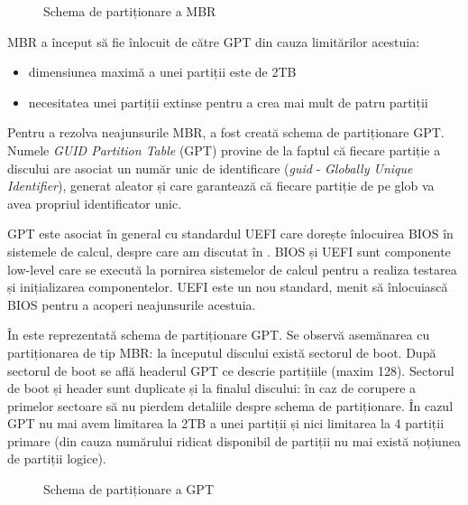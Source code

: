\begin{figure}[htbp]
  \centering
  \def\svgwidth{\columnwidth}
  
  \caption{Schema de partiționare a MBR}
  \label{fig:storage:mbr}
\end{figure}

MBR a început să fie înlocuit de către GPT din cauza limitărilor acestuia:
\begin{itemize}
  \item dimensiunea maximă a unei partiții este de 2TB
  \item necesitatea unei partiții extinse pentru a crea mai mult de patru partiții
\end{itemize}

Pentru a rezolva neajunsurile MBR, a fost creată schema de partiționare
GPT. Numele \textit{GUID Partition Table} (GPT) provine de la faptul că fiecare partiție a
discului are asociat un număr unic de identificare (\textit{guid} - \textit{Globally Unique Identifier}), generat aleator și
care garantează că fiecare partiție de pe glob va avea propriul identificator
unic.

GPT este asociat în general cu standardul UEFI care dorește înlocuirea
BIOS în sistemele de calcul, despre care am discutat în . BIOS și UEFI sunt componente low-level care
se execută la pornirea sistemelor de calcul pentru a realiza testarea și
inițializarea componentelor. UEFI este un nou standard, menit să înlocuiască
BIOS pentru a acoperi neajunsurile acestuia.

În  este reprezentată schema de
partiționare GPT. Se observă asemănarea cu partiționarea de tip MBR: la
începutul discului există sectorul de boot. După sectorul de boot se află headerul GPT ce descrie
partițiile (maxim 128). Sectorul de boot și header sunt duplicate și la finalul
discului: în caz de corupere a primelor sectoare să nu pierdem detaliile despre
schema de partiționare. În cazul GPT nu mai avem limitarea la 2TB a unei
partiții și nici limitarea la 4 partiții primare (din cauza numărului ridicat
disponibil de partiții nu mai există noțiunea de partiții logice).

\begin{figure}[htbp]
  \centering
  \def\svgwidth{\columnwidth}
  
  \caption{Schema de partiționare a GPT}
  \label{fig:storage:gpt}
\end{figure}

